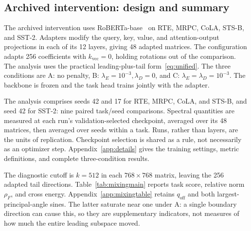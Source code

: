 \documentclass{article}
\newcommand{\off}{\mathrm{off}}
\begin{document}
\subsection{Archived intervention: design and summary}
\label{app:archiveddesign}
The archived intervention uses RoBERTa-base~\citep{liu2019roberta} on RTE, MRPC, CoLA, STS-B, and SST-2. Adapters modify the query, key, value, and attention-output projections in each of its 12 layers, giving 48 adapted matrices. The configuration adapts 256 coefficients with $k_{\mathrm{vec}}=0$, holding rotations out of the comparison. The analysis uses the practical leading-plus-tail form~\eqref{eq:unified}. The three conditions are A: no penalty, B: $\lambda_E=10^{-3},\lambda_D=0$, and C: $\lambda_E=\lambda_D=10^{-3}$. The backbone is frozen and the task head trains jointly with the adapter.

The analysis comprises seeds 42 and 17 for RTE, MRPC, CoLA, and STS-B, and seed 42 for SST-2: nine paired task/seed comparisons. Spectral quantities are measured at each run's validation-selected checkpoint, averaged over its 48 matrices, then averaged over seeds within a task. Runs, rather than layers, are the units of replication. Checkpoint selection is shared as a rule, not necessarily as an optimizer step. Appendix~\ref{app:details} gives the training settings, metric definitions, and complete three-condition results.

The diagnostic cutoff is $k=512$ in each $768\times768$ matrix, leaving the 256 adapted tail directions. Table~\ref{tab:mixingmain} reports task score, relative norm $\rho_F$, and cross energy. Appendix~\ref{app:mixingtable} retains $q_{\off}$ and both largest-principal-angle sines. The latter saturate near one under A: a single boundary direction can cause this, so they are supplementary indicators, not measures of how much the entire leading subspace moved.
\end{document}
